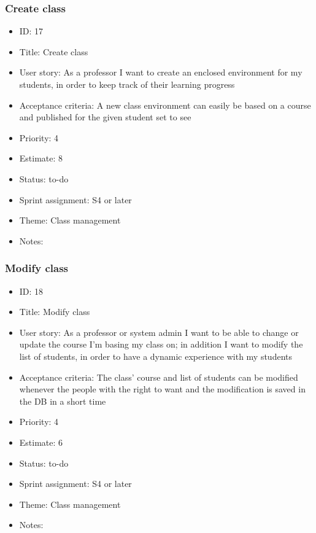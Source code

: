 \subsubsection{Create class}
\begin{itemize}
	\item ID: 17
	\item Title: Create class
	\item User story: As a professor I want to create an enclosed environment for my students, in order to keep track of their learning progress
	\item Acceptance criteria: A new class environment can easily be based on a course and published for the given student set to see
	\item Priority: 4
	\item Estimate: 8
	\item Status: to-do
	\item Sprint assignment: S4 or later
	\item Theme: Class management
	\item Notes:
\end{itemize}

\subsubsection{Modify class}
\begin{itemize}
	\item ID: 18
	\item Title: Modify class
	\item User story: As a professor or system admin I want to be able to change or update the course I'm basing my class on; in addition I want to modify the list of students, in order to have a dynamic experience with my students
	\item Acceptance criteria: The class' course and list of students can be modified whenever the people with the right to want and the modification is saved in the DB in a short time
	\item Priority: 4
	\item Estimate: 6
	\item Status: to-do
	\item Sprint assignment: S4 or later
	\item Theme: Class management
	\item Notes:
\end{itemize}


